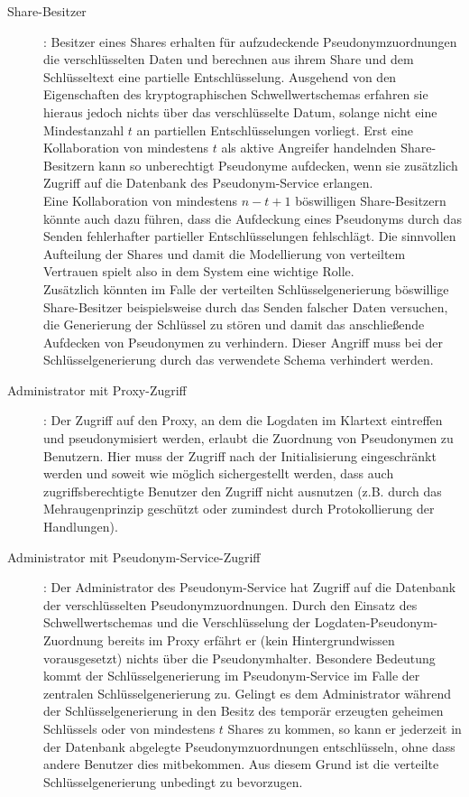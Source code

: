 \begin{description}
  \item[Share-Besitzer]: Besitzer eines Shares erhalten für aufzudeckende Pseudonymzuordnungen die verschlüsselten Daten und berechnen aus ihrem Share und dem Schlüsseltext eine partielle Entschlüsselung. Ausgehend von den Eigenschaften des kryptographischen Schwellwertschemas erfahren sie hieraus jedoch nichts über das verschlüsselte Datum, solange nicht eine Mindestanzahl \(t\) an partiellen Entschlüsselungen vorliegt. Erst eine Kollaboration von mindestens \(t\) als aktive Angreifer handelnden Share-Besitzern kann so unberechtigt Pseudonyme aufdecken, wenn sie zusätzlich Zugriff auf die Datenbank des Pseudonym-Service erlangen. \\
  Eine Kollaboration von mindestens \(n-t+1\) böswilligen Share-Besitzern könnte auch dazu führen, dass die Aufdeckung eines Pseudonyms durch das Senden fehlerhafter partieller Entschlüsselungen fehlschlägt. Die sinnvollen Aufteilung der Shares und damit die Modellierung von verteiltem Vertrauen spielt also in dem System eine wichtige Rolle.\\
  Zusätzlich könnten im Falle der verteilten Schlüsselgenerierung böswillige Share-Besitzer beispielsweise durch das Senden falscher Daten versuchen, die Generierung der Schlüssel zu stören und damit das anschließende Aufdecken von Pseudonymen zu verhindern. Dieser Angriff muss bei der Schlüsselgenerierung durch das verwendete Schema verhindert werden.
  
  \item[Administrator mit Proxy-Zugriff]: Der Zugriff auf den Proxy, an dem die Logdaten im Klartext eintreffen und pseudonymisiert werden, erlaubt die Zuordnung von Pseudonymen zu Benutzern. Hier muss der Zugriff nach der Initialisierung eingeschränkt werden und soweit wie möglich sichergestellt werden, dass auch zugriffsberechtigte Benutzer den Zugriff nicht ausnutzen (z.B. durch das Mehraugenprinzip geschützt oder zumindest durch Protokollierung der Handlungen).
  
  \item[Administrator mit Pseudonym-Service-Zugriff]: Der Administrator des Pseudonym-Service hat Zugriff auf die Datenbank der verschlüsselten Pseudonymzuordnungen. Durch den Einsatz des Schwellwertschemas und die Verschlüsselung der Logdaten-Pseudonym-Zuordnung bereits im Proxy erfährt er (kein Hintergrundwissen vorausgesetzt) nichts über die Pseudonymhalter. Besondere Bedeutung kommt der Schlüsselgenerierung im Pseudonym-Service im Falle der zentralen Schlüsselgenerierung zu. Gelingt es dem Administrator während der Schlüsselgenerierung in den Besitz des temporär erzeugten geheimen Schlüssels oder von mindestens \(t\) Shares zu kommen, so kann er jederzeit in der Datenbank abgelegte Pseudonymzuordnungen entschlüsseln, ohne dass andere Benutzer dies mitbekommen. Aus diesem Grund ist die verteilte Schlüsselgenerierung unbedingt zu bevorzugen.
\end{description}